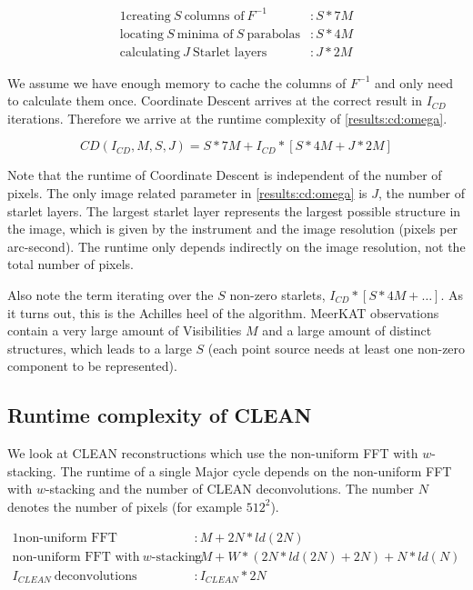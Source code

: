 \begin{alignat*}{1}
\text{creating} \:S\: \text{columns of}\: F^{-1} &: S*7M\\
\text{locating} \:S\: \text{minima of} \:S\: \text{parabolas} &: S*4M\\
\text{calculating} \:J\: \text{Starlet layers} &: J * 2M
\end{alignat*}

We assume we have enough memory to cache the columns of $F^{-1}$ and only need to calculate them once. Coordinate Descent arrives at the correct result in $I_{CD}$ iterations. Therefore we arrive at the runtime complexity of \eqref{results:cd:omega}.

\begin{equation}\label{results:cd:omega}
CD(I_{CD}, M, S, J) = S*7M + I_{CD} * [S * 4M + J * 2M]
\end{equation}

Note that the runtime of Coordinate Descent is independent of the number of pixels. The only image related parameter in \eqref{results:cd:omega} is $J$, the number of starlet layers. The largest starlet layer represents the largest possible structure in the image, which is given by the instrument and the image resolution (pixels per arc-second). The runtime only depends indirectly on the image resolution, not the total number of pixels.

Also note the term iterating over the $S$ non-zero starlets, $ I_{CD} * [S * 4M +\ldots]$. As it turns out, this is the Achilles heel of the algorithm. MeerKAT observations contain a very large amount of Visibilities $M$ and a large amount of distinct structures, which leads to a large $S$ (each point source needs at least one non-zero component to be represented). 

\subsection{Runtime complexity of CLEAN}
We look at CLEAN reconstructions which use the non-uniform FFT with $w$-stacking. The runtime of a single Major cycle depends on the non-uniform FFT with $w$-stacking and the number of CLEAN deconvolutions. The number $N$ denotes the number of pixels (for example $512^2$).

\begin{alignat*}{1}
	\text{non-uniform FFT} &: M + 2N*ld(2N)\\
	\text{non-uniform FFT with} \:w\text{-stacking} &:M + W*(2N*ld(2N) + 2N) + N*ld(N)\\
	I_{CLEAN}\: \text{deconvolutions} &: I_{CLEAN}*2N
\end{alignat*}


